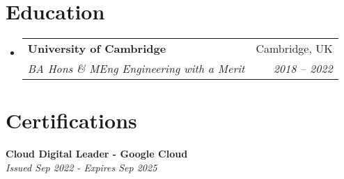 \documentclass[letterpaper,11pt]{article}
\makeatletter
\newcommand{\resumeSubheading}[4]{
  \vspace{-2pt}\item
    \begin{tabular*}{0.97\textwidth}[t]{l@{\extracolsep{\fill}}r}
      \textbf{#1} & #2 \\
      \textit{\small#3} & \textit{\small #4} \\
    \end{tabular*}\vspace{-7pt}
}
\newcommand{\resumeSubHeadingListStart}{\begin{itemize}[leftmargin=0.15in, label={}]}
\newcommand{\resumeSubHeadingListEnd}{\end{itemize}}
\makeatother
\begin{document}
\section{Education}
  \resumeSubHeadingListStart
    \resumeSubheading
      {University of Cambridge}{Cambridge, UK}
      {BA Hons \& MEng Engineering with a Merit}{2018 -- 2022}
  \resumeSubHeadingListEnd

\section{Certifications}
  \begin{itemize}[leftmargin=0.15in, label={}]
    \small{\item{
     \textbf{Cloud Digital Leader - Google Cloud} \\
     \textit{Issued Sep 2022 - Expires Sep 2025} \\
    }}
 \end{itemize}
\end{document}

